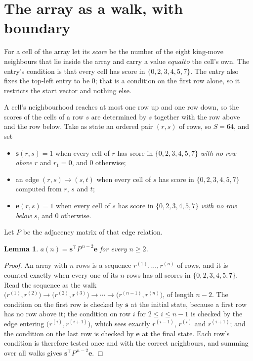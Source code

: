 \documentclass[11pt,a4paper]{article}
\theoremstyle{plain}
\newtheorem{lemma}[theorem]{Lemma}
\theoremstyle{definition}
\begin{document}
\section{The array as a walk, with boundary}

For a cell of the array let its \emph{score} be the number of the eight king-move neighbours that lie inside
the array and carry a value $equal to$ the cell's own. The entry's condition is that every cell
has score in $\{0,2,3,4,5,7\}$. The entry also fixes the top-left entry to be $0$; that is a condition on the first row alone, so it restricts the start vector and nothing else.

A cell's neighbourhood reaches at most one row up and one row down, so the scores of the
cells of a row $s$ are determined by $s$ together with the row above and the row below.
Take as state an ordered pair $(r,s)$ of rows, so $S=64$, and set
\begin{itemize}
\item $\mathbf{s}(r,s)=1$ when every cell of $r$ has score in $\{0,2,3,4,5,7\}$ \emph{with no row
above $r$} and $r_1=0$, and $0$ otherwise;
\item an edge $(r,s)\to(s,t)$ when every cell of $s$ has score in $\{0,2,3,4,5,7\}$ computed from
$r$, $s$ and $t$;
\item $\mathbf{e}(r,s)=1$ when every cell of $s$ has score in $\{0,2,3,4,5,7\}$ \emph{with no row
below $s$}, and $0$ otherwise.
\end{itemize}
Let $P$ be the adjacency matrix of that edge relation.

\begin{lemma}\label{lem:walk}
$a(n)=\mathbf{s}^{\!\top}P^{\,n-2}\mathbf{e}$ for every $n\ge2$.
\end{lemma}

\begin{proof}
An array with $n$ rows is a sequence $r^{(1)},\dots,r^{(n)}$ of rows, and it is counted
exactly when every one of its $n$ rows has all scores in $\{0,2,3,4,5,7\}$. Read the sequence as the
walk $\bigl(r^{(1)},r^{(2)}\bigr)\to\bigl(r^{(2)},r^{(3)}\bigr)\to\cdots\to
\bigl(r^{(n-1)},r^{(n)}\bigr)$, of length $n-2$. The condition on the first row is
checked by $\mathbf{s}$ at the initial state, because a first row has no row above it; the
condition on row $i$ for $2\le i\le n-1$ is checked by the edge entering
$\bigl(r^{(i)},r^{(i+1)}\bigr)$, which sees exactly $r^{(i-1)}$, $r^{(i)}$ and
$r^{(i+1)}$; and the condition on the last row is checked by $\mathbf{e}$ at the final
state. Each row's condition is therefore tested once and with the correct neighbours, and
summing over all walks gives $\mathbf{s}^{\!\top}P^{\,n-2}\mathbf{e}$.
\end{proof}
\end{document}
